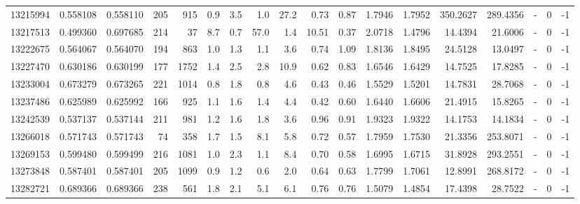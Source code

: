 \begin{tabular}{rrrrrrrrrrrrrrrlrr}
  13215994 & 0.558108 &   0.558110 &  205 &  915 &      0.9 &      3.5 &     1.0 &     27.2 &       0.73 &        0.87 &  1.7946 &  1.7952 &  350.2627 &  289.4356 &             - &        0 &         -1 \\
  13217513 & 0.499360 &   0.697685 &  214 &   37 &      8.7 &      0.7 &    57.0 &      1.4 &      10.51 &        0.37 &  2.0718 &  1.4796 &   14.4394 &   21.6006 &             - &        0 &         -1 \\
  13222675 & 0.564067 &   0.564070 &  194 &  863 &      1.0 &      1.3 &     1.1 &      3.6 &       0.74 &        1.09 &  1.8136 &  1.8495 &   24.5128 &   13.0497 &             - &        0 &         -1 \\
  13227470 & 0.630186 &   0.630199 &  177 & 1752 &      1.4 &      2.5 &     2.8 &     10.9 &       0.62 &        0.83 &  1.6546 &  1.6429 &   14.7525 &   17.8285 &             - &        0 &         -1 \\
  13233004 & 0.673279 &   0.673265 &  221 & 1014 &      0.8 &      1.8 &     0.8 &      4.6 &       0.43 &        0.46 &  1.5529 &  1.5201 &   14.7831 &   28.7068 &             - &        0 &         -1 \\
  13237486 & 0.625989 &   0.625992 &  166 &  925 &      1.1 &      1.6 &     1.4 &      4.4 &       0.42 &        0.60 &  1.6440 &  1.6606 &   21.4915 &   15.8265 &             - &        0 &         -1 \\
  13242539 & 0.537137 &   0.537144 &  211 &  981 &      1.2 &      1.6 &     1.8 &      3.6 &       0.96 &        0.91 &  1.9323 &  1.9322 &   14.1753 &   14.1834 &             - &        0 &         -1 \\
  13266018 & 0.571743 &   0.571743 &   74 &  358 &      1.7 &      1.5 &     8.1 &      5.8 &       0.72 &        0.57 &  1.7959 &  1.7530 &   21.3356 &  253.8071 &             - &        0 &         -1 \\
  13269153 & 0.599480 &   0.599499 &  216 & 1081 &      1.0 &      2.3 &     1.1 &      8.4 &       0.70 &        0.58 &  1.6995 &  1.6715 &   31.8928 &  293.2551 &             - &        0 &         -1 \\
  13273848 & 0.587401 &   0.587401 &  205 & 1099 &      0.9 &      1.2 &     0.6 &      2.0 &       0.64 &        0.63 &  1.7799 &  1.7061 &   12.8991 &  268.8172 &             - &        0 &         -1 \\
  13282721 & 0.689366 &   0.689366 &  238 &  561 &      1.8 &      2.1 &     5.1 &      6.1 &       0.76 &        0.76 &  1.5079 &  1.4854 &   17.4398 &   28.7522 &             - &        0 &         -1 \\

\end{tabular}
